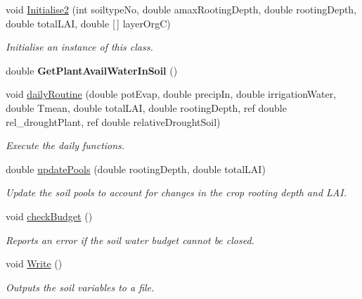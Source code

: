 \begin{DoxyCompactItemize}
void \mbox{\hyperlink{classsimplesoil_model_1_1simple_soil_ae4a82d34a86b81420ca86f7364038f57}{Initialise2}} (int soiltype\+No, double amax\+Rooting\+Depth, double rooting\+Depth, double total\+L\+AI, double \mbox{[}$\,$\mbox{]} layer\+OrgC)
\begin{DoxyCompactList}\small\item\em Initialise an instance of this class. \end{DoxyCompactList}\item 
\mbox{\label{classsimplesoil_model_1_1simple_soil_a6209b0b03b7ffac86ceecf7bc1f3b8c0}} 
double {\bfseries Get\+Plant\+Avail\+Water\+In\+Soil} ()
\item 
void \mbox{\hyperlink{classsimplesoil_model_1_1simple_soil_a04390b2df05316b8bfee985a4d29e90a}{daily\+Routine}} (double pot\+Evap, double precip\+In, double irrigation\+Water, double Tmean, double total\+L\+AI, double rooting\+Depth, ref double rel\+\_\+drought\+Plant, ref double relative\+Drought\+Soil)
\begin{DoxyCompactList}\small\item\em Execute the daily functions. \end{DoxyCompactList}\item 
double \mbox{\hyperlink{classsimplesoil_model_1_1simple_soil_a1cdf6eb12b0414d1fc6002a08f803f05}{update\+Pools}} (double rooting\+Depth, double total\+L\+AI)
\begin{DoxyCompactList}\small\item\em Update the soil pools to account for changes in the crop rooting depth and L\+AI. \end{DoxyCompactList}\item 
\mbox{\label{classsimplesoil_model_1_1simple_soil_a40799ba66476c4a190adafc91169699f}} 
void \mbox{\hyperlink{classsimplesoil_model_1_1simple_soil_a40799ba66476c4a190adafc91169699f}{check\+Budget}} ()
\begin{DoxyCompactList}\small\item\em Reports an error if the soil water budget cannot be closed. \end{DoxyCompactList}\item 
void \mbox{\hyperlink{classsimplesoil_model_1_1simple_soil_a8e716d4ae99f278b1bf013e04e0de57c}{Write}} ()
\begin{DoxyCompactList}\small\item\em Outputs the soil variables to a file. \end{DoxyCompactList}\item 

\end{DoxyCompactItemize}
